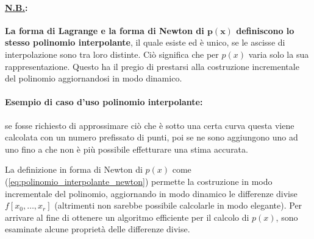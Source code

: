 \paragraph{\ul{N.B.}:} \textbf{La forma di Lagrange e la forma di Newton di $\boldsymbol{p(x)}$ definiscono lo stesso polinomio interpolante}, il quale esiste ed è unico, se le ascisse di interpolazione sono tra loro distinte. Ciò significa che per $p(x)$ varia solo la sua rappresentazione. Questo ha il pregio di prestarsi alla costruzione incrementale del polinomio aggiornandosi in modo dinamico.

\paragraph{Esempio di caso d'uso polinomio interpolante:} se fosse richiesto di approssimare ciò che è sotto una certa curva questa viene calcolata con un numero prefissato di punti, poi se ne sono aggiungono uno ad uno fino a che non è più possibile effetturare una stima accurata.

La definizione in forma di Newton di $p(x)$ come (\ref{eq:polinomio_interpolante_newton}) permette la costruzione in modo incrementale del polinomio, aggiornando in modo dinamico le differenze divise $f[x_0,\hdots, x_r]$ (altrimenti non sarebbe possibile calcolarle in modo elegante). Per arrivare al fine di ottenere un algoritmo efficiente per il calcolo di $p(x)$, sono esaminate alcune proprietà delle differenze divise.

